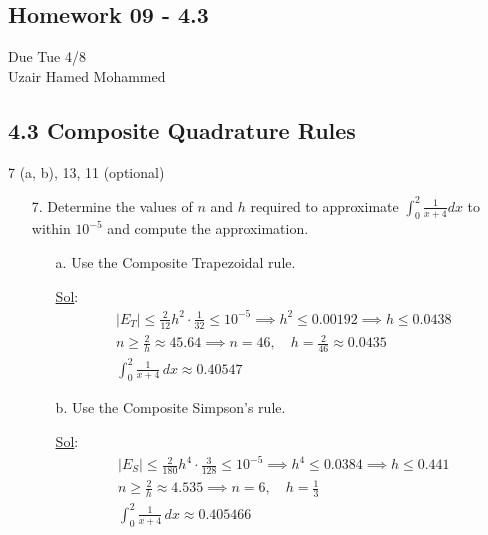 \begin{center}
  \section*{Homework 09 - 4.3}
  Due Tue 4/8 \\
  Uzair Hamed Mohammed
\end{center}

\subsection*{4.3 Composite Quadrature Rules}

7 (a, b), 13, 11 (optional)

\begin{enumerate}
  \item[7.] Determine the values of \(n\) and \(h\) required to
    approximate \(\int_{0}^{2} \frac{1}{x + 4} dx\) to within
    \(10^{-5}\) and compute the approximation.

    \begin{enumerate}
      \item[a.] Use the Composite Trapezoidal rule.

        \underline{Sol}:\\
        \[
          \begin{array}{l}
            \displaystyle |E_T| \leq \frac{2}{12} h^2 \cdot
            \frac{1}{32} \leq 10^{-5} \implies h^2 \leq 0.00192
            \implies h \leq 0.0438 \\
            \displaystyle n \geq \frac{2}{h} \approx 45.64 \implies n
            = 46,\quad h = \frac{2}{46} \approx 0.0435 \\
            \displaystyle \int_{0}^{2} \frac{1}{x+4} \, dx \approx
            \boxed{0.40547}
          \end{array}
        \]

      \item[b.] Use the Composite Simpson's rule.

        \underline{Sol}:\\
        \[
          \begin{array}{l}
            \displaystyle |E_S| \leq \frac{2}{180} h^4 \cdot
            \frac{3}{128} \leq 10^{-5} \implies h^4 \leq 0.0384
            \implies h \leq 0.441 \\
            \displaystyle n \geq \frac{2}{h} \approx 4.535 \implies n
            = 6,\quad h = \frac{1}{3} \\
            \displaystyle \int_{0}^{2} \frac{1}{x+4} \, dx \approx
            \boxed{0.405466}
          \end{array}
        \]


\end{enumerate}
\end{enumerate}
